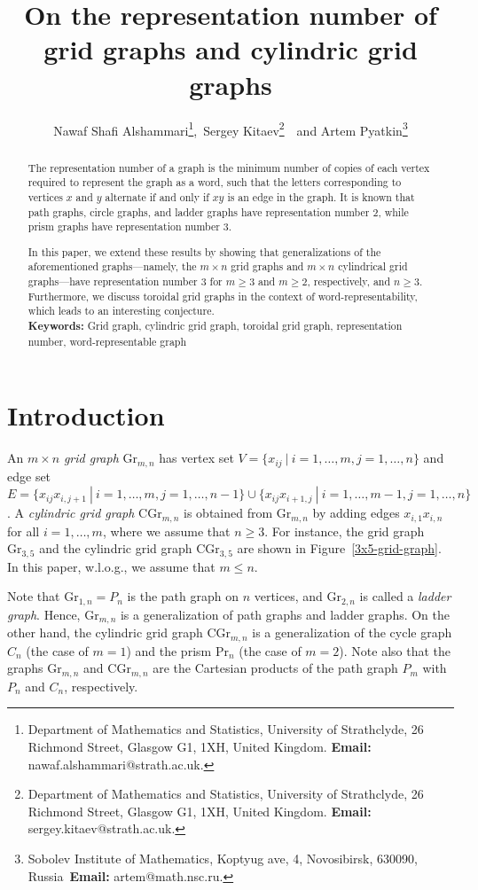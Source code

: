 \documentclass[11pt]{article}
\title{On the representation number of grid graphs and cylindric grid graphs}
\author{Nawaf Shafi Alshammari\footnote{Department of Mathematics and Statistics, University of Strathclyde, 26 Richmond Street, Glasgow G1, 1XH, United Kingdom. 
{\bf Email:} nawaf.alshammari@strath.ac.uk.},\ 
Sergey Kitaev\footnote{Department of Mathematics and Statistics, University of Strathclyde, 26 Richmond Street, Glasgow G1, 1XH, United Kingdom. 
{\bf Email:} sergey.kitaev@strath.ac.uk.}\ \ and Artem Pyatkin\footnote{Sobolev Institute of Mathematics, Koptyug ave, 4, Novosibirsk, 630090, Russia\  {\bf Email:} artem@math.nsc.ru.}}
\begin{document}
	\maketitle
	
	
\begin{abstract}
The representation number of a graph is the minimum number of copies of each vertex required to represent the graph as a word, such that the letters corresponding to vertices $x$ and $y$ alternate if and only if $xy$ is an edge in the graph. It is known that path graphs, circle graphs, and ladder graphs have representation number 2, while prism graphs have representation number 3.

In this paper, we extend these results by showing that generalizations of the aforementioned graphs---namely, the $m \times n$ grid graphs and $m \times n$ cylindrical grid graphs---have representation number $3$ for $m \geq 3$ and $m \geq 2$, respectively, and $n \geq 3$. Furthermore, we discuss toroidal grid graphs in the context of word-representability, which leads to an interesting conjecture.\\[-3mm]

\noindent
{\bf Keywords:} Grid graph, cylindric grid graph, toroidal grid graph, representation number, word-representable graph
		\end{abstract}	

\section{Introduction}
An $m\times n$ {\em grid graph}  $\mbox{Gr}_{m,n}$ has vertex set $V=\{x_{ij}\ |\ i=1,\ldots,m, j=1,\ldots,n\}$ and edge set 
$E=\{x_{ij}x_{i,j+1}\ |\  i=1,\ldots,m, j=1,\ldots,n-1\} \cup \{x_{ij}x_{i+1,j}\ |\  i=1,\ldots,m-1, j=1,\ldots,n\}$. A {\em cylindric grid graph} $\mbox{CGr}_{m,n}$ is obtained from $\mbox{Gr}_{m,n}$ by adding edges $x_{i,1}x_{i,n}$ for all $i=1,\ldots,m$, where we assume that $n\geq 3$. For instance, the grid graph $\mbox{Gr}_{3,5}$ and the cylindric grid graph $\mbox{CGr}_{3,5}$ are shown in Figure~\ref{3x5-grid-graph}. In this paper, w.l.o.g., we assume that $m\leq n$. 

Note that $\mbox{Gr}_{1,n}=P_n$ is the path graph on $n$ vertices,  and $\mbox{Gr}_{2,n}$  is called a {\em ladder graph}. Hence, $\mbox{Gr}_{m,n}$ is a generalization of path graphs and ladder graphs. On the other hand, the cylindric grid graph  $\mbox{CGr}_{m,n}$ is a generalization of the cycle graph $C_n$ (the case of $m=1$) and the prism $\mbox{Pr}_n$ (the case of $m=2$).  Note also that the graphs $\mathrm{Gr}_{m,n}$ and $\mathrm{CGr}_{m,n}$ are the Cartesian products of the path graph $P_m$ with $P_n$ and $C_n$, respectively.
\end{document}
